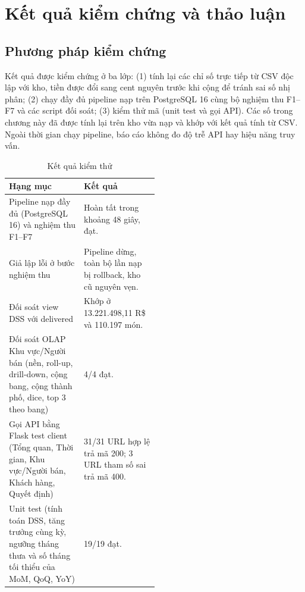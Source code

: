 \section{Kết quả kiểm chứng và thảo luận}\label{sec:results}
\subsection{Phương pháp kiểm chứng}
Kết quả được kiểm chứng ở ba lớp: (1) tính lại các chỉ số trực tiếp từ CSV độc lập với kho, tiền được đổi sang cent nguyên trước khi cộng để tránh sai số nhị phân; (2) chạy đầy đủ pipeline nạp trên PostgreSQL 16 cùng bộ nghiệm thu F1--F7 và các script đối soát; (3) kiểm thử mã (unit test và gọi API). Các số trong chương này đã được tính lại trên kho vừa nạp và khớp với kết quả tính từ CSV. Ngoài thời gian chạy pipeline, báo cáo không đo độ trễ API hay hiệu năng truy vấn.

\begin{table}[H]\centering\small\renewcommand{\arraystretch}{1.15}
\begin{tabularx}{\linewidth}{>{\raggedright\arraybackslash}p{0.5\linewidth}Y}
\toprule Hạng mục & Kết quả\\\midrule
Pipeline nạp đầy đủ (PostgreSQL 16) và nghiệm thu F1--F7 & Hoàn tất trong khoảng 48 giây, đạt.\\
Giả lập lỗi ở bước nghiệm thu & Pipeline dừng, toàn bộ lần nạp bị rollback, kho cũ nguyên vẹn.\\
Đối soát view DSS với  delivered & Khớp ở 13.221.498,11 R\$ và 110.197 món.\\
Đối soát OLAP Khu vực/Người bán (nền, roll-up, drill-down, cộng bang, cộng thành phố, dice, top 3 theo bang) & 4/4 đạt.\\
Gọi API bằng Flask test client (Tổng quan, Thời gian, Khu vực/Người bán, Khách hàng, Quyết định) & 31/31 URL hợp lệ trả mã 200; 3 URL tham số sai trả mã 400.\\
Unit test (tính toán DSS, tăng trưởng cùng kỳ, ngưỡng tháng thưa và số tháng tối thiểu của MoM, QoQ, YoY) & 19/19 đạt.\\
\bottomrule\end{tabularx}
\caption{Kết quả kiểm thử}
\end{table}

